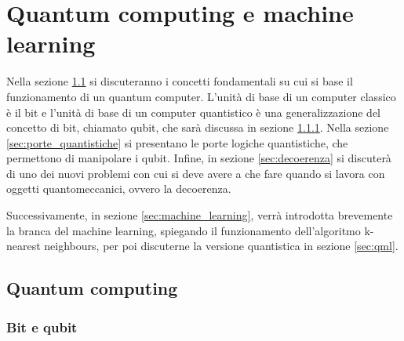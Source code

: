\chapter{Quantum computing e machine learning}\label{ch:teoria}


Nella sezione \ref{sec:quantum_computing} si discuteranno i concetti fondamentali su 
cui si base il funzionamento di un quantum computer. 
L'unità di base di un computer classico è il bit e l'unità di base di 
un computer quantistico è una generalizzazione del concetto di bit, 
chiamato qubit, che sarà discussa in sezione \ref{sec:qubit}. 
Nella sezione \ref{sec:porte_quantistiche} si presentano le porte 
logiche quantistiche, che permettono di manipolare i qubit. 
Infine, in sezione \ref{sec:decoerenza} si discuterà di uno dei nuovi problemi con 
cui si deve avere a che fare quando si lavora con oggetti quantomeccanici, ovvero 
la decoerenza. 

Successivamente, in sezione \ref{sec:machine_learning}, verrà introdotta brevemente 
la branca del machine learning, spiegando il funzionamento dell'algoritmo k-nearest neighbours, 
per poi discuterne la versione quantistica in sezione \ref{sec:qml}. 

\section{Quantum computing} \label{sec:quantum_computing}

\subsection{Bit e qubit} \label{sec:qubit}

